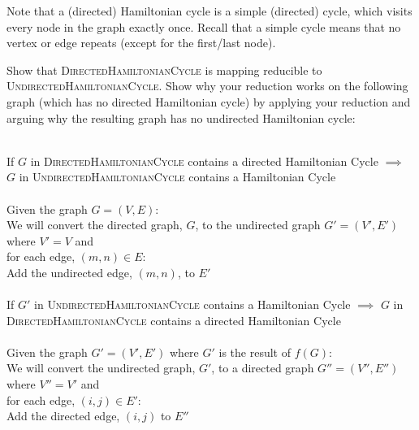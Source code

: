\documentclass[11pt]{article}
\theoremstyle{definition}
\theoremstyle{theorem}
\newcommand{\solution}{\medskip\noindent{\color{blue}\textbf{Solution:}}}
\begin{document}
Note that a (directed) Hamiltonian cycle is a simple (directed) cycle, which visits every node in the graph exactly once. Recall that a simple cycle means that no vertex or edge repeats (except for the first/last node).

Show that \textsc{DirectedHamiltonianCycle} is mapping reducible to \textsc{UndirectedHamiltonianCycle}. Show why your reduction works on the following graph (which has no directed Hamiltonian cycle) by applying your reduction and arguing why the resulting graph has no undirected Hamiltonian cycle:



\solution \\
If $G$ in \textsc{DirectedHamiltonianCycle} contains a directed Hamiltonian Cycle $\implies$ $G$ in \textsc{UndirectedHamiltonianCycle} contains a Hamiltonian Cycle \\~\\
\noindent Given the graph $G = (V, E)$: \\
We will convert the directed graph, $G$, to the undirected graph $G' = (V', E')$ where $V' = V$ and \\ for each edge, $(m, n) \in E$: \\
\indent Add the undirected edge, $(m, n)$, to $E'$  \\~\\

\noindent If $G'$ in \textsc{UndirectedHamiltonianCycle} contains a Hamiltonian Cycle $\implies$ $G$ in \textsc{DirectedHamiltonianCycle} contains a directed Hamiltonian Cycle \\~\\
\noindent Given the graph $G' = (V', E')$ where $G'$ is the result of $f(G)$: \\
We will convert the undirected graph, $G'$, to a directed graph $G'' = (V'', E'')$ where $V'' = V'$ and \\ for each edge, $(i, j) \in E'$: \\ 
\indent Add the directed edge, $(i, j)$ to $E''$ \\~\\
\end{document}
